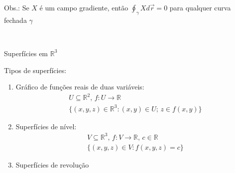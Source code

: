\begin{center}
\end{center}

\null\hspace{48pt}Obs.: Se $X$ é um campo gradiente, então $\displaystyle\oint_\gamma X d\vec{r}=0$ para qualquer curva fechada $\gamma$\\	


\begin{center}		
		\hrulefill \vspace{12pt} \\	
		\begin{Large}
			Superfícies em $\mathbb{R}^3$
		\end{Large}
	\end{center}

\begin{large}
	Tipos de superfícies:
\end{large}
\begin{enumerate}
\item Gráfico de funções reais de duas variáveis:
\begin{gather*}
U \subseteq \mathbb{R}^2 \text{, } f:U\to\mathbb{R} \\
\{ (x,y,z) \in \mathbb{R}^3: (x,y) \in U \text{; } z \in f(x,y) \}
\end{gather*}
\item Superfícies de nível:
\begin{gather*}
V \subseteq \mathbb{R}^3 \text{, } f:V\to\mathbb{R}\text{, } c \in \mathbb{R} \\
\{ (x,y,z) \in V: f(x,y,z)=c \}
\end{gather*}
\item Superfícies de revolução
\end{enumerate}

